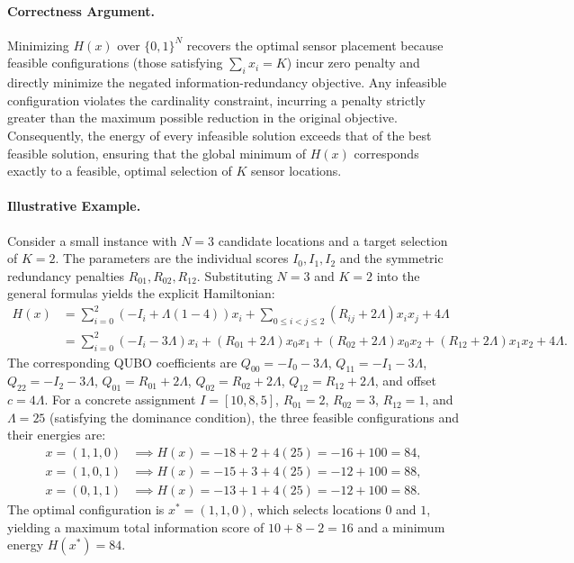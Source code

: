 \documentclass[12pt]{article}
\begin{document}
\paragraph{Correctness Argument.}
Minimizing $H(x)$ over $\{0,1\}^N$ recovers the optimal sensor placement because feasible configurations (those satisfying $\sum_i x_i = K$) incur zero penalty and directly minimize the negated information-redundancy objective. Any infeasible configuration violates the cardinality constraint, incurring a penalty strictly greater than the maximum possible reduction in the original objective. Consequently, the energy of every infeasible solution exceeds that of the best feasible solution, ensuring that the global minimum of $H(x)$ corresponds exactly to a feasible, optimal selection of $K$ sensor locations.

\paragraph{Illustrative Example.}
Consider a small instance with $N=3$ candidate locations and a target selection of $K=2$. The parameters are the individual scores $I_0, I_1, I_2$ and the symmetric redundancy penalties $R_{01}, R_{02}, R_{12}$. Substituting $N=3$ and $K=2$ into the general formulas yields the explicit Hamiltonian:
\begin{align}
H(x) &= \sum_{i=0}^{2} \left( -I_i + \Lambda(1 - 4) \right) x_i + \sum_{0 \leq i < j \leq 2} \left( R_{ij} + 2\Lambda \right) x_i x_j + 4\Lambda \nonumber \\
&= \sum_{i=0}^{2} \left( -I_i - 3\Lambda \right) x_i + \left( R_{01} + 2\Lambda \right) x_0 x_1 + \left( R_{02} + 2\Lambda \right) x_0 x_2 + \left( R_{12} + 2\Lambda \right) x_1 x_2 + 4\Lambda.
\end{align}
The corresponding QUBO coefficients are $Q_{00} = -I_0 - 3\Lambda$, $Q_{11} = -I_1 - 3\Lambda$, $Q_{22} = -I_2 - 3\Lambda$, $Q_{01} = R_{01} + 2\Lambda$, $Q_{02} = R_{02} + 2\Lambda$, $Q_{12} = R_{12} + 2\Lambda$, and offset $c = 4\Lambda$. For a concrete assignment $I = [10, 8, 5]$, $R_{01}=2$, $R_{02}=3$, $R_{12}=1$, and $\Lambda = 25$ (satisfying the dominance condition), the three feasible configurations and their energies are:
\begin{align}
x = (1,1,0) &\implies H(x) = -18 + 2 + 4(25) = -16 + 100 = 84, \\
x = (1,0,1) &\implies H(x) = -15 + 3 + 4(25) = -12 + 100 = 88, \\
x = (0,1,1) &\implies H(x) = -13 + 1 + 4(25) = -12 + 100 = 88.
\end{align}
The optimal configuration is $x^* = (1,1,0)$, which selects locations $0$ and $1$, yielding a maximum total information score of $10 + 8 - 2 = 16$ and a minimum energy $H(x^*) = 84$.
\end{document}
